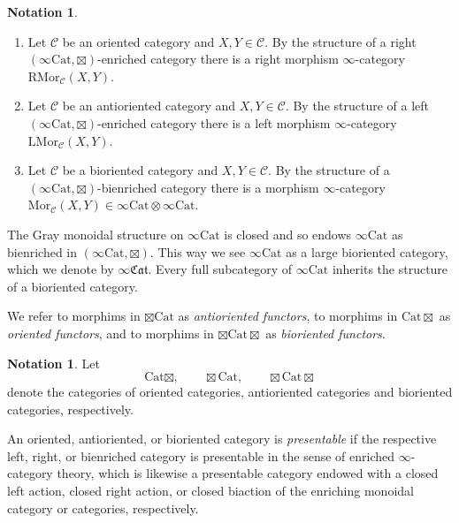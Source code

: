 \documentclass[10pt,oneside]{article}
\numberwithin{equation}{section} %
\numberwithin{figure}{section} %
\theoremstyle{plain}
\theoremstyle{definition}
\newtheorem{notation}[thm]{Notation}
\newcommand{\mC}{{\mathcal C}}
\renewcommand{\L}{{\mathrm L}}
\newcommand{\R}{{\mathrm R}}
\newcommand{\X}{X}
\newcommand{\Y}{Y}
\newcommand{\Cat}{\mathrm{Cat}}
\newcommand{\Mor}{{\mathrm{Mor}}}
\newcommand{\fcat}{\mathfrak{Cat}}
\begin{document}
\begin{notation}
\begin{enumerate}[\normalfont(1)]\setlength{\itemsep}{-2pt}
\item Let $\mC$ be an oriented category and $\X,\Y \in \mC.$	
By the structure of a right $(\infty\Cat,\boxtimes)$-enriched category there is a right morphism $\infty$-category $\R\Mor_\mC(\X,\Y)$.

\item Let $\mC$ be an antioriented category and $\X,\Y \in \mC.$	
By the structure of a left $(\infty\Cat,\boxtimes)$-enriched category there
is a left morphism $\infty$-category $\L\Mor_\mC(\X,\Y)$.

\item Let $\mC$ be a bioriented category and $\X,\Y \in \mC.$	
By the structure of a $(\infty\Cat,\boxtimes)$-bienriched category there
is a morphism $\infty$-category $\Mor_\mC(\X,\Y) \in \infty\Cat \otimes \infty\Cat.$

\end{enumerate}
	
\end{notation}

\begin{example}
The Gray monoidal structure on $\infty\Cat$ is closed and so endows $\infty\Cat$ as bienriched in $(\infty\Cat,\boxtimes).$ This way we see
$\infty\Cat$ as a large bioriented category, which we denote by $ \infty\fcat.$
Every full subcategory of $\infty\Cat$ inherits the structure of a bioriented category.

\end{example}	

\begin{definition}
We refer to morphims in $\boxtimes\Cat$ as {\em antioriented functors}, to morphims in $\Cat\boxtimes$ as {\em oriented functors}, and to morphims in $\boxtimes\Cat\boxtimes$ as {\em bioriented functors}.
\end{definition}

\begin{notation}

Let $$\Cat\boxtimes,\qquad \boxtimes\Cat,\qquad \boxtimes\Cat\boxtimes$$
denote the categories of oriented categories, antioriented categories and bioriented categories, respectively.
\end{notation}




\begin{remark}
An oriented, antioriented, or bioriented category is {\em presentable} if the respective left, right, or bienriched category is presentable in the sense of enriched $\infty$-category theory, which is likewise a presentable category endowed with a closed left action, closed right action, or closed biaction of the enriching monoidal category or categories, respectively.
\end{remark}
\end{document}
